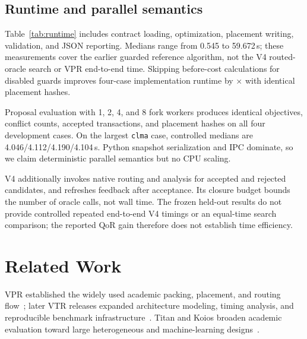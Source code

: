 \documentclass[sigconf,anonymous,review]{acmart}
\newcommand{\vpr}{\textsc{VPR}}
\begin{document}
\subsection{Runtime and parallel semantics}

\begin{table}[t]
\centering
\small
\caption{Earlier single-core Python reference refinement, excluding V4 oracle calls, after three warm-ups and
seven measured repetitions on logical CPU 31.}
\label{tab:runtime}
\resizebox{\columnwidth}{!}{}
\end{table}

Table~\ref{tab:runtime} includes contract loading, optimization, placement
writing, validation, and JSON reporting.  Medians range from 0.545 to
59.672\,s; these measurements cover the earlier guarded reference algorithm,
not the V4 routed-oracle search or \vpr{} end-to-end time.  Skipping
before-cost calculations for disabled guards improves four-case implementation
runtime by \GuardRuntimeSpeedup$\times$ with identical placement hashes.

Proposal evaluation with 1, 2, 4, and 8 fork workers produces identical
objectives, conflict counts, accepted transactions, and placement hashes on
all four development cases.  On the largest \texttt{clma} case, controlled
medians are 4.046/4.112/4.190/4.104\,s.  Python snapshot serialization and IPC
dominate, so we claim deterministic parallel semantics but no CPU scaling.

V4 additionally invokes native routing and analysis for accepted and rejected
candidates, and refreshes feedback after acceptance.  Its closure budget bounds
the number of oracle calls, not wall time.  The frozen held-out results do not
provide controlled repeated end-to-end V4 timings or an equal-time search
comparison; the reported QoR gain therefore does not establish time efficiency.

\section{Related Work}

VPR established the widely used academic packing, placement, and routing
flow~\cite{betz1997vpr}; later VTR releases expanded architecture modeling,
timing analysis, and reproducible benchmark infrastructure~\cite{vtr8}.
Titan and Koios broaden academic evaluation toward large heterogeneous and
machine-learning designs~\cite{murray2013titan,talaei2023titan2,arora2021koios}.
\end{document}
